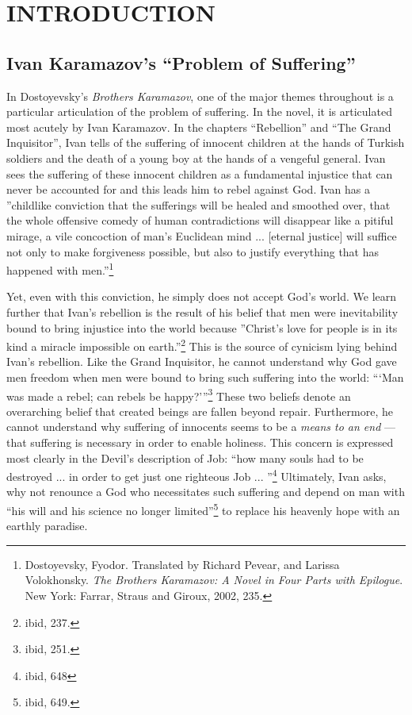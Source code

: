 \tableofcontents
\chapter{INTRODUCTION}

\pagestyle{myheadings}

\label{introduction}
\section{Ivan Karamazov's ``Problem of Suffering''}
In Dostoyevsky's \emph{Brothers Karamazov}, one of the major themes throughout is a particular articulation of the problem of suffering. In the novel, it is articulated most acutely by Ivan Karamazov. In the chapters ``Rebellion'' and ``The Grand Inquisitor'', Ivan tells of the suffering of innocent children at the hands of Turkish soldiers and the death of a young boy at the hands of a vengeful general. Ivan sees the suffering of these innocent children as a fundamental injustice that can never be accounted for and this leads him to rebel against God. Ivan has a ''childlike conviction that the sufferings will be healed and smoothed over, that the whole offensive comedy of human contradictions will disappear like a pitiful mirage, a vile concoction of man's Euclidean mind ... [eternal justice] will suffice not only to make forgiveness possible, but also to justify everything that has happened with men.''\footnote{Dostoyevsky, Fyodor. Translated by Richard Pevear, and Larissa Volokhonsky. \emph{The Brothers Karamazov: A Novel in Four Parts with Epilogue}. New York: Farrar, Straus and Giroux, 2002, 235.}

Yet, even with this conviction, he simply does not accept God's world. We learn further that Ivan's rebellion is the result of his belief that men were inevitability bound to bring injustice into the world because ''Christ's love for people is in its kind a miracle impossible on earth.''\footnote{ibid, 237.} This is the source of cynicism lying behind Ivan's rebellion. Like the Grand Inquisitor, he cannot understand why God gave men freedom when men were bound to bring such suffering into the world: ```Man was made a rebel; can rebels be happy?'''\footnote{ibid, 251.} These two beliefs denote an overarching belief that created beings are fallen beyond repair. Furthermore, he cannot understand why suffering of innocents seems to be a \emph{means to an end} --- that suffering is necessary in order to enable holiness. This concern is expressed most clearly in the Devil's description of Job: ``how many souls had to be destroyed ... in order to get just one righteous Job ... ''\footnote{ibid, 648} Ultimately, Ivan asks, why not renounce a God who necessitates such suffering and depend on man with ``his will and his science no longer limited''\footnote{ibid, 649.} to replace his heavenly hope with an earthly paradise.

